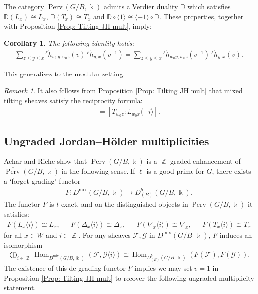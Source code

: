 \documentclass[11pt]{article}
\DeclareMathOperator{\Perv}{Perv}
\DeclareMathOperator{\mix}{mix}
\DeclareMathOperator{\Z}{\mathbb{Z}}
\DeclareMathOperator{\Hom}{Hom}
\newtheorem{cor}[thm]{Corollary}
\theoremstyle{remark}
\newtheorem{rem}[thm]{Remark}
\theoremstyle{definition}
\begin{document}
    
	The category $\Perv(G/B,\Bbbk)$ admits a Verdier duality $\mathbb{D}$ which satisfies $\mathbb{D}(L_x) \cong L_x$, $\mathbb{D}(T_x) \cong T_x$ and $\mathbb{D} \circ \langle 1 \rangle \cong \langle -1 \rangle \circ \mathbb{D}$. 
	These properties, together with Proposition \ref{Prop: Tilting JH mult}, imply: 
	
	\begin{cor}\label{cor:numerical duality}
		The following identity holds:
		\begin{align*}
			\sum_{z \leq y \leq x} {}^{\ell} \check{h}_{w_0 y, w_0 z}(v) ~{}^{\ell} \check{h}_{y,x}(v^{-1})
			=
			\sum_{z \leq y \leq x} {}^{\ell} \check{h}_{w_0 y, w_0 z}(v^{-1}) ~{}^{\ell} \check{h}_{y,x}(v).
		\end{align*}
	\end{cor}
	This generalises \cite[\S 6(d)]{DL23} to the modular setting. 

    \begin{rem}
		It also follows from Proposition \ref{Prop: Tilting JH mult} that mixed tilting sheaves satisfy the reciprocity formula: 
        \begin{align*}
            [T_x : L_z \langle i \rangle] = [T_{w_0 z} : L_{w_0 x} \langle -i \rangle].
        \end{align*}
	\end{rem}



\subsection{Ungraded Jordan--H\"{o}lder multiplicities}
\label{subsec: ungraded JH}

    Achar and Riche \cite[\S5.3]{AR16} show that $\Perv(G/B, \Bbbk)$ is a $\Z$-graded enhancement of $\overline{\Perv}(G/B,\Bbbk)$ in the following sense. 
	If $\ell$ is a good prime for $G$, there exists a `forget grading' functor 
	\begin{align*}
		F : D^{\mix} (G/B, \Bbbk) \rightarrow D^b_{(B)}(G/B, \Bbbk).
	\end{align*}
    The functor $F$ is $t$-exact, and on the distinguished objects in $\Perv(G/B, \Bbbk)$ it satisfies:
	\begin{align*}
		F(L_x \langle i \rangle) \cong \overline{L}_x,
		&&
		F(\Delta_x \langle i \rangle) \cong \overline{\Delta}_x,
		&&
		F(\nabla_x \langle i \rangle) \cong \overline{\nabla}_x,
		&&
		F(T_x \langle i \rangle) \cong \overline{T}_x
	\end{align*}
	for all $x \in W$ and $i \in \Z$. For any sheaves $\mathcal{F}, \mathcal{G}$ in $D^{\mix} (G/B, \Bbbk)$, $F$ induces an isomorphism  
	\begin{align*}
		\bigoplus_{i \in \Z }\Hom_{D^{\mix}(G/B, \Bbbk)}(\mathcal{F},\mathcal{G} \langle i \rangle )
		\cong 
		\Hom_{D^b_{(B)}(G/B, \Bbbk)}(F(\mathcal{F}), F(\mathcal{G})). 
	\end{align*}
	The existence of this de-grading functor $F$ implies we may set $v=1$ in Proposition \ref{Prop: Tilting JH mult} to recover the following ungraded multiplicity statement.
	
\end{document}
